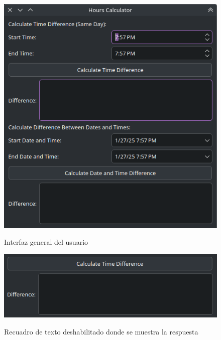 \documentclass[conference]{IEEEtran}
\begin{document}
    \begin{figure}[H]
        {\includegraphics[width=\breite\columnwidth]{images/UI.png}}
        \caption{Interfaz general del usuario}
        \label{fig:UI}
    \end{figure}
    
    \begin{figure}[H]
        {\includegraphics[width=\breite\columnwidth]{images/des.png}}
        \caption{Recuadro de texto deshabilitado donde se muestra la respuesta}
        \label{fig:des}
    \end{figure}
    
\end{document}
